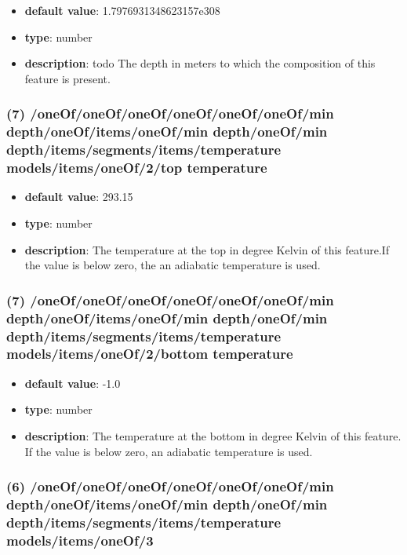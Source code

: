 \begin{itemize}[leftmargin=7em]\item {\bf default value}: 1.7976931348623157e308
\item {\bf type}: number
\item {\bf description}: todo The depth in meters to which the composition of this feature is present.
\end{itemize}\subsubsection{(7) /oneOf/oneOf/oneOf/oneOf/oneOf/oneOf/min depth/oneOf/items/oneOf/min depth/oneOf/min depth/items/segments/items/temperature models/items/oneOf/2/top temperature}
\begin{itemize}[leftmargin=7em]\item {\bf default value}: 293.15
\item {\bf type}: number
\item {\bf description}: The temperature at the top in degree Kelvin of this feature.If the value is below zero, the an adiabatic temperature is used.
\end{itemize}\subsubsection{(7) /oneOf/oneOf/oneOf/oneOf/oneOf/oneOf/min depth/oneOf/items/oneOf/min depth/oneOf/min depth/items/segments/items/temperature models/items/oneOf/2/bottom temperature}
\begin{itemize}[leftmargin=7em]\item {\bf default value}: -1.0
\item {\bf type}: number
\item {\bf description}: The temperature at the bottom in degree Kelvin of this feature. If the value is below zero, an adiabatic temperature is used.
\end{itemize}\subsubsection{(6) /oneOf/oneOf/oneOf/oneOf/oneOf/oneOf/min depth/oneOf/items/oneOf/min depth/oneOf/min depth/items/segments/items/temperature models/items/oneOf/3}
